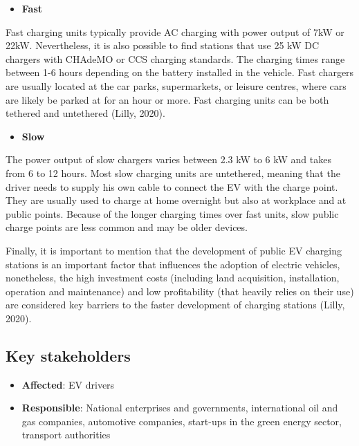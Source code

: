 \documentclass[
]{book}
\providecommand{\tightlist}{%
  \setlength{\itemsep}{0pt}\setlength{\parskip}{0pt}}
\begin{document}
\begin{itemize}
\tightlist
\item
  \textbf{Fast}
\end{itemize}

Fast charging units typically provide AC charging with power output of 7kW or 22kW. Nevertheless, it is also possible to find stations that use 25 kW DC chargers with CHAdeMO or CCS charging standards. The charging times range between 1-6 hours depending on the battery installed in the vehicle. Fast chargers are usually located at the car parks, supermarkets, or leisure centres, where cars are likely be parked at for an hour or more. Fast charging units can be both tethered and untethered (Lilly, 2020).

\begin{itemize}
\tightlist
\item
  \textbf{Slow}
\end{itemize}

The power output of slow chargers varies between 2.3 kW to 6 kW and takes from 6 to 12 hours. Most slow charging units are untethered, meaning that the driver needs to supply his own cable to connect the EV with the charge point. They are usually used to charge at home overnight but also at workplace and at public points. Because of the longer charging times over fast units, slow public charge points are less common and may be older devices.

Finally, it is important to mention that the development of public EV charging stations is an important factor that influences the adoption of electric vehicles, nonetheless, the high investment costs (including land acquisition, installation, operation and maintenance) and low profitability (that heavily relies on their use) are considered key barriers to the faster development of charging stations (Lilly, 2020).

\hypertarget{key-stakeholders-5}{%
\subsection*{Key stakeholders}\label{key-stakeholders-5}}

\begin{itemize}
\tightlist
\item
  \textbf{Affected}: EV drivers
\item
  \textbf{Responsible}: National enterprises and governments, international oil and gas companies, automotive companies, start-ups in the green energy sector, transport authorities
\end{itemize}
\end{document}
